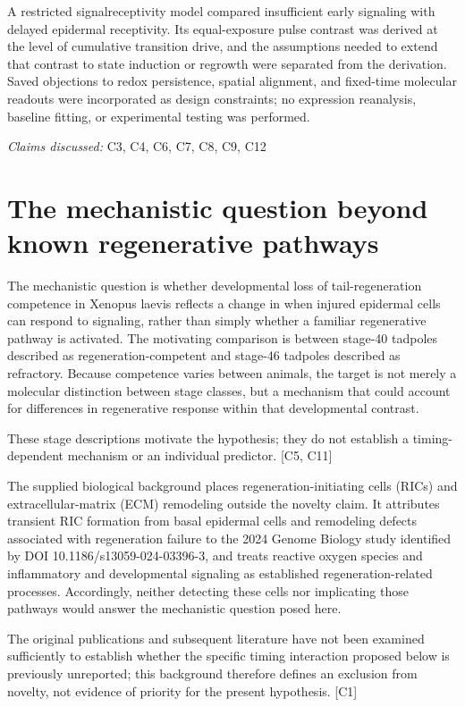 \documentclass[11pt]{article}
\begin{document}
A restricted signal\textendash{}receptivity model compared insufficient early signaling with delayed epidermal receptivity. Its equal-exposure pulse contrast was derived at the level of cumulative transition drive, and the assumptions needed to extend that contrast to state induction or regrowth were separated from the derivation. Saved objections to redox persistence, spatial alignment, and fixed-time molecular readouts were incorporated as design constraints; no expression reanalysis, baseline fitting, or experimental testing was performed.

\textit{Claims discussed: }C3, C4, C6, C7, C8, C9, C12
\section{The mechanistic question beyond known regenerative pathways}
The mechanistic question is whether developmental loss of tail-regeneration competence in Xenopus laevis reflects a change in when injured epidermal cells can respond to signaling, rather than simply whether a familiar regenerative pathway is activated. The motivating comparison is between stage-40 tadpoles described as regeneration-competent and stage-46 tadpoles described as refractory. Because competence varies between animals, the target is not merely a molecular distinction between stage classes, but a mechanism that could account for differences in regenerative response within that developmental contrast.

These stage descriptions motivate the hypothesis; they do not establish a timing-dependent mechanism or an individual predictor. [C5, C11]

The supplied biological background places regeneration-initiating cells (RICs) and extracellular-matrix (ECM) remodeling outside the novelty claim. It attributes transient RIC formation from basal epidermal cells and remodeling defects associated with regeneration failure to the 2024 Genome Biology study identified by DOI 10.1186/s13059-024-03396-3, and treats reactive oxygen species and inflammatory and developmental signaling as established regeneration-related processes. Accordingly, neither detecting these cells nor implicating those pathways would answer the mechanistic question posed here.

The original publications and subsequent literature have not been examined sufficiently to establish whether the specific timing interaction proposed below is previously unreported; this background therefore defines an exclusion from novelty, not evidence of priority for the present hypothesis. [C1]
\end{document}
